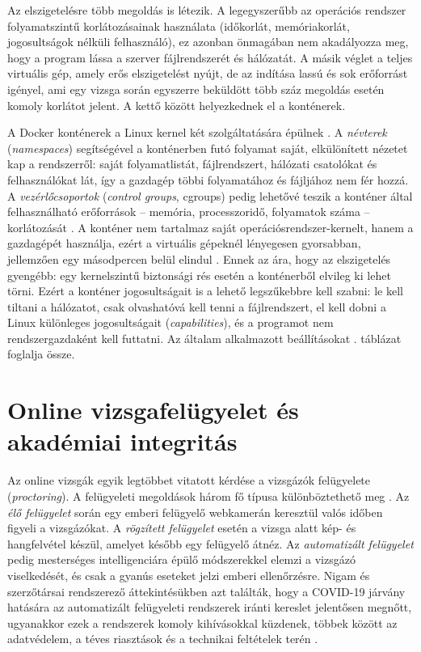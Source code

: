 Az elszigetelésre több megoldás is létezik. A legegyszerűbb az operációs rendszer
folyamatszintű korlátozásainak használata (időkorlát, memóriakorlát, jogosultságok nélküli
felhasználó), ez azonban önmagában nem akadályozza meg, hogy a program lássa a szerver
fájlrendszerét és hálózatát. A másik véglet a teljes virtuális gép, amely erős elszigetelést nyújt,
de az indítása lassú és sok erőforrást igényel, ami egy vizsga során egyszerre beküldött több
száz megoldás esetén komoly korlátot jelent. A kettő között helyezkednek el a konténerek.

A Docker konténerek a Linux kernel két szolgáltatására épülnek \cite{merkel2014docker}. A
\textit{névterek} (\textit{namespaces}) segítségével a konténerben futó folyamat saját, elkülönített
nézetet kap a rendszerről: saját folyamatlistát, fájlrendszert, hálózati csatolókat és
felhasználókat lát, így a gazdagép többi folyamatához és fájljához nem fér hozzá. A
\textit{vezérlőcsoportok} (\textit{control groups}, cgroups) pedig lehetővé teszik a konténer által
felhasználható erőforrások -- memória, processzoridő, folyamatok száma -- korlátozását
\cite{docker_docs}. A konténer nem tartalmaz saját operációsrendszer-kernelt, hanem a gazdagépét
használja, ezért a virtuális gépeknél lényegesen gyorsabban, jellemzően egy másodpercen belül
elindul \cite{merkel2014docker}. Ennek az ára, hogy az elszigetelés gyengébb: egy kernelszintű
biztonsági rés esetén a konténerből elvileg ki lehet törni. Ezért a konténer jogosultságait is a
lehető legszűkebbre kell szabni: le kell tiltani a hálózatot, csak olvashatóvá kell tenni a
fájlrendszert, el kell dobni a Linux különleges jogosultságait (\textit{capabilities}), és a
programot nem rendszergazdaként kell futtatni. Az általam alkalmazott beállításokat .
táblázat foglalja össze.

\section{Online vizsgafelügyelet és akadémiai integritás}
\label{sec:proctoring}

Az online vizsgák egyik legtöbbet vitatott kérdése a vizsgázók felügyelete
(\textit{proctoring}). A felügyeleti megoldások három fő típusa különböztethető meg
\cite{nigam2021systematic}. Az \textit{élő felügyelet} során egy emberi felügyelő webkamerán
keresztül valós időben figyeli a vizsgázókat. A \textit{rögzített felügyelet} esetén a vizsga
alatt kép- és hangfelvétel készül, amelyet később egy felügyelő átnéz. Az \textit{automatizált
felügyelet} pedig mesterséges intelligenciára épülő módszerekkel elemzi a vizsgázó viselkedését,
és csak a gyanús eseteket jelzi emberi ellenőrzésre. Nigam és szerzőtársai rendszerező
áttekintésükben azt találták, hogy a COVID-19 járvány hatására az automatizált felügyeleti
rendszerek iránti kereslet jelentősen megnőtt, ugyanakkor ezek a rendszerek komoly kihívásokkal
küzdenek, többek között az adatvédelem, a téves riasztások és a technikai feltételek terén
\cite{nigam2021systematic}.

